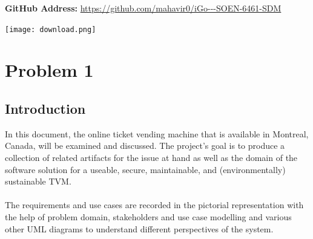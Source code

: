\documentclass[a4paper, 11pt]{report}
\begin{document}
\begin{titlepage}
	
	
	
	\vfill\vfill\vfill\vfill%
	\textbf{GitHub Address:} \url{https://github.com/mahavir0/iGo---SOEN-6461-SDM}

	
 	\vfill\vfill
 	\texttt{[image: download.png]}\\[1cm] %
	 
	
	\vfill %
	
\end{titlepage}



 
\tableofcontents
\chapter{Problem 1}
\section{Introduction}
In this document, the online ticket vending machine that is available in Montreal, Canada, will be examined and discussed. The project's goal is to produce a collection of related artifacts for the issue at hand as well as the domain of the software solution for a useable, secure, maintainable, and (environmentally) sustainable TVM. \\\\
The requirements and use cases are recorded in the pictorial representation with the help of problem domain, stakeholders and use case modelling and various other UML diagrams to understand different perspectives of the system.
\end{document}
